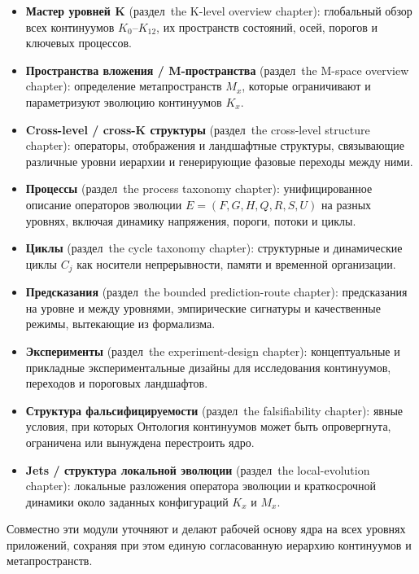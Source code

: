 \begin{itemize}
\item \textbf{Мастер уровней K} (раздел~the K-level overview chapter):
  глобальный обзор всех континуумов \(K_0\)–\(K_{12}\), их пространств
  состояний, осей, порогов и ключевых процессов.

\item \textbf{Пространства вложения / M-пространства}
  (раздел~the M-space overview chapter):
  определение метапространств \(M_x\), которые ограничивают и параметризуют
  эволюцию континуумов \(K_x\).

\item \textbf{Cross-level / cross-K структуры} (раздел~the cross-level structure chapter):
  операторы, отображения и ландшафтные структуры, связывающие различные
  уровни иерархии и генерирующие фазовые переходы между ними.

\item \textbf{Процессы} (раздел~the process taxonomy chapter):
  унифицированное описание операторов эволюции
  \(E = (F,G,H,Q,R,S,U)\) на разных уровнях, включая динамику напряжения,
  пороги, потоки и циклы.

\item \textbf{Циклы} (раздел~the cycle taxonomy chapter):
  структурные и динамические циклы \(C_j\) как носители непрерывности,
  памяти и временной организации.

\item \textbf{Предсказания} (раздел~the bounded prediction-route chapter):
  предсказания на уровне и между уровнями, эмпирические сигнатуры и
  качественные режимы, вытекающие из формализма.

\item \textbf{Эксперименты} (раздел~the experiment-design chapter):
  концептуальные и прикладные экспериментальные дизайны для исследования
  континуумов, переходов и пороговых ландшафтов.

\item \textbf{Структура фальсифицируемости} (раздел~the falsifiability chapter):
  явные условия, при которых Онтология континуумов может быть опровергнута,
  ограничена или вынуждена перестроить ядро.

\item \textbf{Jets / структура локальной эволюции} (раздел~the local-evolution chapter):
  локальные разложения оператора эволюции и краткосрочной динамики
  около заданных конфигураций \(K_x\) и \(M_x\).
\end{itemize}

Совместно эти модули уточняют и делают рабочей основу ядра на всех уровнях
приложений, сохраняя при этом единую согласованную иерархию континуумов и
метапространств.
